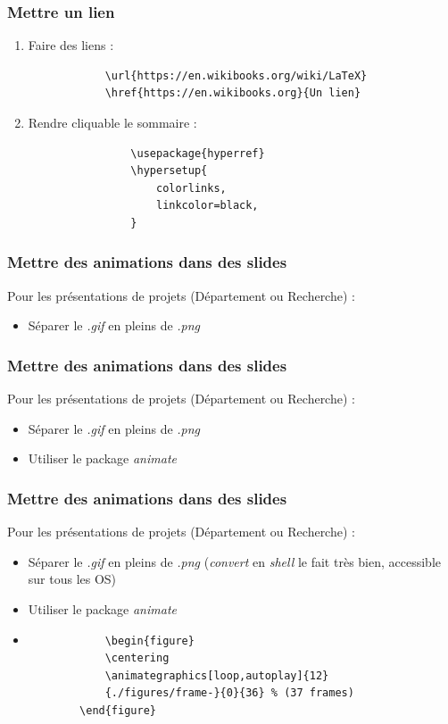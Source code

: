 \documentclass[handout]{beamer}
\begin{document}
\begin{frame}[fragile=singleslide]
	\frametitle{Mettre un lien}

	\begin{enumerate}
		\item Faire des liens :\\
			\begin{verbatim}
			\url{https://en.wikibooks.org/wiki/LaTeX}
			\href{https://en.wikibooks.org}{Un lien}
			\end{verbatim}
		\item Rendre cliquable le sommaire :\\
			\begin{verbatim}
				\usepackage{hyperref}
				\hypersetup{
    				colorlinks,
    				linkcolor=black,
				}
			\end{verbatim}
	\end{enumerate}
\end{frame}

\begin{frame}
	\frametitle{Mettre des animations dans des slides}
	\centering
	Pour les présentations de projets (Département ou Recherche) :\\
	\begin{itemize}
		\item Séparer le \textit{.gif} en pleins de \textit{.png}
	\end{itemize}
\end{frame}

\begin{frame}
	\frametitle{Mettre des animations dans des slides}
	\centering
	Pour les présentations de projets (Département ou Recherche) :\\
	\begin{itemize}
		\item Séparer le \textit{.gif} en pleins de \textit{.png}
		\item Utiliser le package \textit{animate}
	\end{itemize}
\end{frame}

\begin{frame}[fragile=singleslide]
	\frametitle{Mettre des animations dans des slides}
	\centering
	Pour les présentations de projets (Département ou Recherche) :\\
	\begin{itemize}
		\item Séparer le \textit{.gif} en pleins de \textit{.png} (\textit{convert} en \textit{shell} le fait très bien, accessible sur tous les OS)
		\item Utiliser le package \textit{animate}
		\item
			\begin{verbatim}
			\begin{figure}
		    \centering
		    \animategraphics[loop,autoplay]{12}
			{./figures/frame-}{0}{36} % (37 frames)
		\end{figure}
			\end{verbatim}
	\end{itemize}
\end{frame}
\end{document}
